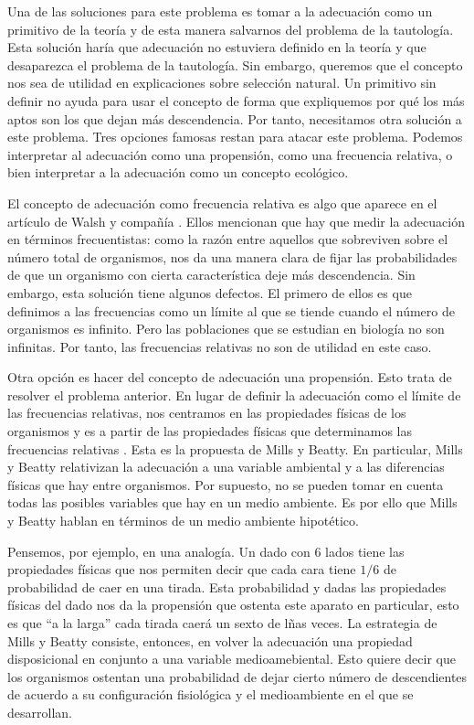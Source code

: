 Una de las soluciones para este problema es tomar a la adecuación como un primitivo de la teoría y de esta manera salvarnos del problema de la tautología. Esta solución haría que adecuación no estuviera definido en la teoría y que desaparezca el problema de la tautología. Sin embargo, queremos que el concepto nos sea de utilidad en explicaciones sobre selección natural. Un primitivo sin definir no ayuda para usar el concepto de forma que expliquemos por qué los más aptos son los que dejan más descendencia. Por tanto, necesitamos otra solución a este problema. Tres opciones famosas restan para atacar este problema. Podemos interpretar al adecuación como una propensión, como una frecuencia relativa, o bien interpretar a la adecuación como un concepto ecológico.

El concepto de adecuación como frecuencia relativa es algo que aparece en el artículo de Walsh y compañía \citeyear{Walsh2002}. Ellos mencionan que hay que medir la adecuación en términos frecuentistas: como la razón entre aquellos que sobreviven sobre el número total de organismos, nos da una manera clara de fijar las probabilidades de que un organismo con cierta característica deje más descendencia. Sin embargo, esta solución tiene algunos defectos. El primero de ellos es que definimos a las frecuencias como un límite al que se tiende cuando el número de organismos es infinito. Pero las poblaciones que se estudian en biología no son infinitas. Por tanto, las frecuencias relativas no son de utilidad en este caso.

Otra opción es hacer del concepto de adecuación una propensión. Esto trata de resolver el problema anterior. En lugar de definir la adecuación como el límite de las frecuencias relativas, nos centramos en las propiedades físicas de los organismos y es a partir de las propiedades físicas que determinamos las frecuencias relativas \cite{Mills1979}. Esta es la propuesta de Mills y Beatty. En particular, Mills y Beatty relativizan la adecuación a una variable ambiental y a las diferencias físicas que hay entre organismos. Por supuesto, no se pueden tomar en cuenta todas las posibles variables que hay en un medio ambiente. Es por ello que Mills y Beatty hablan en términos de un medio ambiente hipotético.

Pensemos, por ejemplo, en una analogía. Un dado con 6 lados tiene las propiedades físicas que nos permiten decir que cada cara tiene $1/6$ de probabilidad de caer en una tirada. Esta probabilidad y dadas las propiedades físicas del dado nos da la propensión que ostenta este aparato en particular, esto es que ``a la larga'' cada tirada caerá un sexto de lñas veces. La estrategia de Mills y Beatty consiste, entonces, en volver la adecuación una propiedad disposicional en conjunto a una variable medioamebiental. Esto quiere decir que los organismos ostentan una probabilidad de dejar cierto número de descendientes de acuerdo a su configuración fisiológica y el medioambiente en el que se desarrollan.

